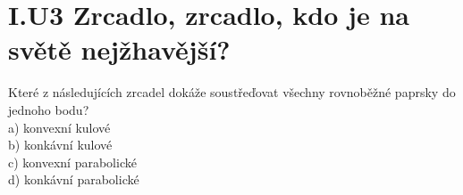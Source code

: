 \documentclass{../../../../style/mkimain}
\begin{document}
\section*{I.U3 Zrcadlo, zrcadlo, kdo je na světě nejžhavější?}
\noindent Které z následujících zrcadel dokáže soustřeďovat všechny rovnoběžné paprsky do jednoho bodu?
\\

a) konvexní kulové
\\

b) konkávní kulové
\\

c) konvexní parabolické
\\

d) konkávní parabolické
\end{document}

